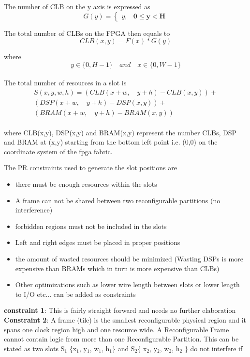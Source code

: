 \documentclass[11pt]{article}
\theoremstyle{definition}
\begin{document}
The number of CLB on the y axis is expressed as 
\begin{equation}
G(y) =  \begin{cases}
y, & \textbf{0$\leq$y$<$H}
\end{cases}
\end{equation}

The total number of CLBs on the FPGA then equals to \\
\begin{equation}
CLB(x,y) =  F(x) * G(y)
\end{equation}					  
					  
\hspace{15mm} where \[y\in \{0, H-1 \}  \quad and \quad x\in \{0, W-1 \} \] \\

The total number of resources in a slot is 
\begin{equation}
\begin{split}
S(x, y, w, h) = (CLB(x+w,\quad y+h) - CLB(x,y)) + \\ 
(DSP(x+w, \quad y+h) - DSP(x,y))  + \\ (BRAM(x+w,\quad y+h) - BRAM(x,y))
\end{split}
\end{equation} \\
where CLB(x,y), DSP(x,y) and BRAM(x,y) represent the number CLBs, DSP and BRAM at (x,y) starting from the bottom left point i.e. (0,0) on the coordinate system of the fpga fabric.

The PR constraints used to generate the slot positions are
\begin{itemize}
\item there must be enough resources within the slots
\item A frame can not be shared between two reconfigurable partitions (no interference)
\item forbidden regions must not be included in the slots 
\item Left and right edges must be placed in proper positions
\item the amount of wasted resources should be minimized (Wasting DSPs is more expensive than BRAMs which in turn is more expensive than CLBs)
\item Other optimizations such as lower wire length between slots or lower length to I/O etc... can be added as constraints
\end{itemize}

\textbf{constraint 1}: This is fairly straight forward and needs no further elaboration \\
\textbf{Constraint 2}: A frame (tile) is the smallest reconfigurable physical region and it spans one clock region high and one resource wide. A Reconfigurable Frame cannot contain logic from more than one Reconfigurable Partition. This can be stated as two slots S$_1$ \{x$_1$, y$_1$, w$_1$, h$_1$\} and S$_2$\{ x$_2$, y$_2$, w$_2$, h$_2$ \} do not interfere if \\
\end{document}
